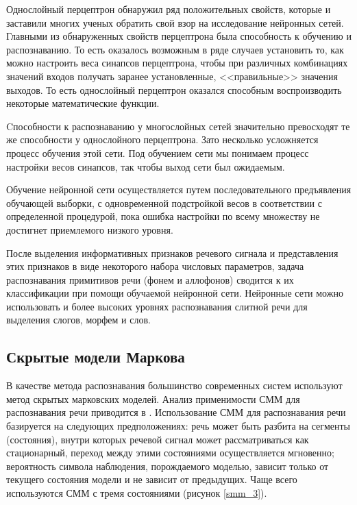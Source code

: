 \documentclass[a4paper,14pt,russian,utf8,nocolumnsxix,nocolumnxxxi,nocolumnxxxii]{eskdtext}
\begin{document}
Однослойный перцептрон обнаружил ряд положительных свойств, которые и заставили многих ученых обратить свой взор на исследование нейронных сетей. Главными из обнаруженных свойств перцептрона была способность к обучению и распознаванию. То есть оказалось возможным в ряде случаев установить то, как можно настроить веса синапсов перцептрона, чтобы при различных комбинациях значений входов получать заранее установленные, <<правильные>> значения выходов. То есть однослойный перцептрон оказался способным воспроизводить некоторые математические функции.

Cпособности к распознаванию у многослойных сетей значительно превосходят те же способности у однослойного перцептрона. Зато несколько усложняется процесс обучения этой сети. Под обучением сети мы понимаем процесс настройки весов синапсов, так чтобы выход сети был ожидаемым.

Обучение нейронной сети осуществляется путем последовательного предъявления обучающей выборки, с одновременной подстройкой весов в соответствии с определенной процедурой, пока ошибка настройки по всему множеству не достигнет приемлемого низкого уровня.\cite{le}

После выделения информативных признаков речевого сигнала и представления этих признаков в виде некоторого набора числовых параметров, задача распознавания примитивов речи (фонем и аллофонов) сводится к их классификации при помощи обучаемой нейронной сети. Нейронные сети можно использовать и более высоких уровнях распознавания слитной речи для выделения слогов, морфем и слов.

\subsection{Скрытые модели Маркова}
В качестве метода распознавания большинство современных систем используют метод скрытых марковских моделей\cite{rosti}.  Анализ применимости СММ для распознавания речи приводится в \cite{rabiner_markov}. Использование СММ для распознавания речи базируется на следующих предположениях:  речь может быть разбита на сегменты  (состояния), внутри которых речевой сигнал может рассматриваться как стационарный,  переход между этими состояниями осуществляется мгновенно;  вероятность символа наблюдения, порождаемого моделью,  зависит только от текущего состояния модели и не зависит от предыдущих. Чаще всего используются СММ с тремя состояниями (рисунок \ref{smm_3}).
\end{document}
